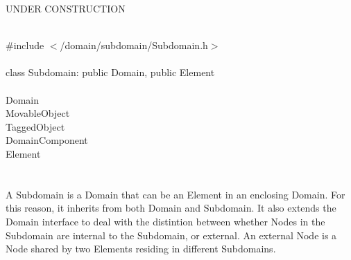 
UNDER CONSTRUCTION

   \\
\indent \#include $<$/domain/subdomain/Subdomain.h$>$  \\

  \\
\indent class Subdomain: public Domain, public Element  \\

 \\
\indent  Domain  \\ 
\indent MovableObject \\
\indent TaggedObject \\
\indent\indent DomainComponent \\
\indent\indent\indent  Element \\
\indent\indent\indent{} \\

  \\
\indent  A Subdomain is a Domain that can be an Element in an
enclosing Domain. For this reason, it inherits from both Domain and
Subdomain. It also extends the Domain interface to deal with the
distintion between whether Nodes in the Subdomain are internal to the
Subdomain, or external. An external Node is a Node shared by two
Elements residing in different Subdomains. \\


